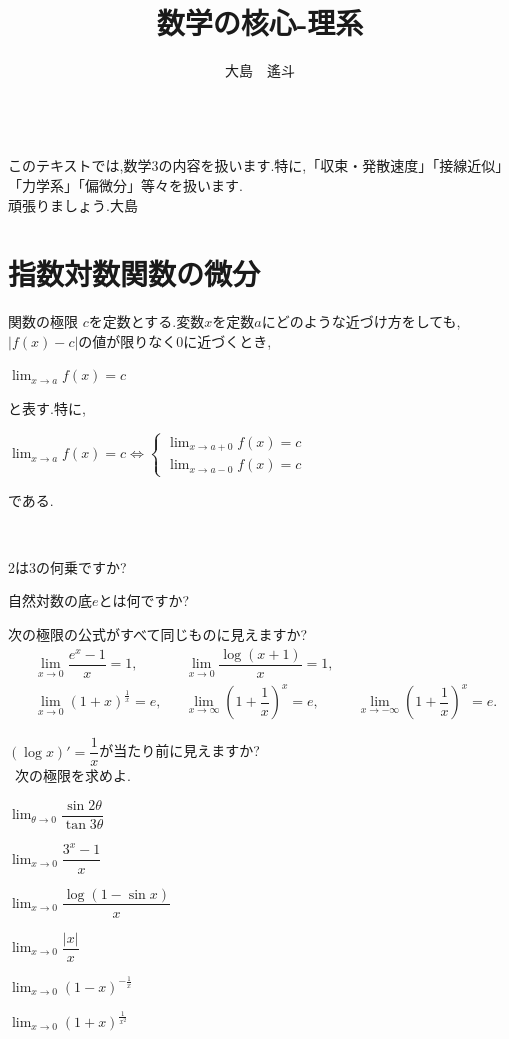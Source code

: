 \documentclass[10pt,fleqn,a4paper]{jsarticle}
\title{数学の核心-理系}
\author{大島　遙斗}
\newcommand{\ans}[1]{\mbox{\boldmath{$#1$}}}
\begin{document}
\maketitle
\newpage
\tableofcontents
\newpage
\noindent{\Large \ans{はじめに}}\\
このテキストでは,数学3の内容を扱います.特に,「収束・発散速度」「接線近似」「力学系」「偏微分」等々を扱います.\\
頑張りましょう.大島
\newpage
\section{指数対数関数の微分}

\begin{itembox}
[l]{\enpitu 関数の極限}
$c$を定数とする.変数$x$を定数$a$にどのような近づけ方をしても,
$|f(x)-c|$の値が限りなく0に近づくとき,
\begin{center}
$\displaystyle \lim_{x\to a}f(x)=c$
\end{center}
と表す.特に,
\begin{center}
$
\displaystyle
\lim_{x\to a}f(x)=c
\Longleftrightarrow
\begin{cases}
\displaystyle\lim_{x\to a+0}f(x)=c\\[2mm]
\displaystyle\lim_{x\to a-0}f(x)=c
\end{cases}
$
\end{center}
である.
\end{itembox}

\newpage

\noindent{}\
\par\noindent\kakkoichi 2は3の何乗ですか?\
\par\noindent\kakkoni 自然対数の底$e$とは何ですか?\
\par\noindent\kakkosan 次の極限の公式がすべて同じものに見えますか?\
\begin{align*}
&\lim_{x\to0}\dfrac{e^x-1}{x}=1,
&&\lim_{x\to0}\dfrac{\log(x+1)}{x}=1,\\
&\lim_{x\to0}(1+x)^{\frac{1}{x}}=e,
&&\lim_{x\to\infty}\left(1+\dfrac{1}{x}\right)^x=e,
&&\lim_{x\to-\infty}\left(1+\dfrac{1}{x}\right)^x=e.
\end{align*}
\par\noindent\kakkoshi $(\log x)'=\dfrac{1}{x}$が当たり前に見えますか?\\

\noindent\ba{1$\bullet$2}\
次の極限を求めよ.\
\par\noindent\kakkoichi $\displaystyle\lim_{\theta\to0}\dfrac{\sin2\theta}{\tan3\theta}$\
\par\noindent\kakkoni $\displaystyle\lim_{x\to0}\dfrac{3^x-1}{x}$\
\par\noindent\kakkosan $\displaystyle\lim_{x\to0}\dfrac{\log(1-\sin x)}{x}$\
\par\noindent\kakkoshi $\displaystyle\lim_{x\to0}\dfrac{|x|}{x}$\
\par\noindent\kakkogo $\displaystyle\lim_{x\to0}(1-x)^{-\frac{1}{x}}$\
\par\noindent\kakkoroku $\displaystyle\lim_{x\to0}(1+x)^{\frac{1}{x^2}}$\
\end{document}
